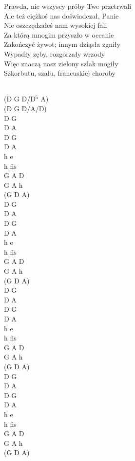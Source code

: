 \documentclass[a5paper, 10pt]{book}
\begin{document}
\begin{minipage}[t]{0.7\textwidth}
  Prawda, nie wszyscy próby Twe przetrwali\\
  Ale też ciężkoś nas doświadczał, Panie\\
  Nie oszczędzałeś nam wysokiej fali\\
  Za którą mnogim przyszło w oceanie\\
  Zakończyć żywot; innym dziąsła zgniły\\
  Wypadły zęby, rozgorzały wrzody\\
  Więc znaczą nasz zielony szlak mogiły\\
  Szkorbutu, szału, francuskiej choroby\\
  \\

\end{minipage}
\begin{minipage}[t]{0.3\textwidth}
  (D G D/D$^5$ A)\\
  (D G D/A/D)\\
  D G\\
  D A \\
  D G\\
  D A\\
  h e \\
  h fis\\
  G A D\\
  G A h\\
  (G D A)\\

  D G\\
  D A \\
  D G\\
  D A\\
  h e \\
  h fis\\
  G A D\\
  G A h\\
  (G D A)\\

  D G\\
  D A \\
  D G\\
  D A\\
  h e \\
  h fis\\
  G A D\\
  G A h\\
  (G D A)\\

  D G\\
  D A \\
  D G\\
  D A\\
  h e \\
  h fis\\
  G A D\\
  G A h\\
  (G D A)\\

\end{minipage}
\end{document}
